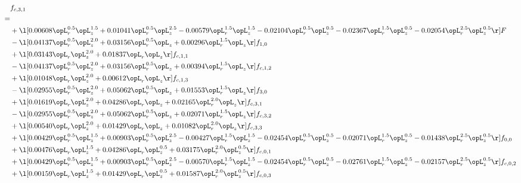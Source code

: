 \begin{alignat}{2} 
\label{eq:f_31_1} 
& f_{c,3,1} \nonumber \\ 
 = \\ 
& + \l[  0.00608 \opL_r^{0.5} \opL_z^{1.5} +  0.01041 \opL_r^{0.5} \opL_z^{2.5}   -0.00579 \opL_r^{1.5} \opL_z^{1.5}   -0.02104 \opL_r^{0.5} \opL_z^{0.5}   -0.02367 \opL_r^{1.5} \opL_z^{0.5}   -0.02054 \opL_r^{2.5} \opL_z^{0.5}  \r] F \nonumber \\ 
& - \l[  0.04137 \opL_r^{0.5} \opL_z^{2.0} +  0.03156 \opL_r^{0.5} \opL_z +  0.00296 \opL_r^{1.5} \opL_z  \r] f_{1,0} \nonumber \\ 
& + \l[  0.03143 \opL_r \opL_z^{2.0} +  0.01837 \opL_r \opL_z  \r] f_{c,1,1} \nonumber \\ 
& - \l[  0.04137 \opL_r^{0.5} \opL_z^{2.0} +  0.03156 \opL_r^{0.5} \opL_z +  0.00394 \opL_r^{1.5} \opL_z  \r] f_{c,1,2} \nonumber \\ 
& + \l[  0.01048 \opL_r \opL_z^{2.0} +  0.00612 \opL_r \opL_z  \r] f_{c,1,3} \nonumber \\ 
& - \l[  0.02955 \opL_r^{0.5} \opL_z^{2.0} +  0.05062 \opL_r^{0.5} \opL_z +  0.01553 \opL_r^{1.5} \opL_z  \r] f_{3,0} \nonumber \\ 
& + \l[  0.01619 \opL_r \opL_z^{2.0} +  0.04286 \opL_r \opL_z +  0.02165 \opL_r^{2.0} \opL_z  \r] f_{c,3,1} \nonumber \\ 
& - \l[  0.02955 \opL_r^{0.5} \opL_z^{2.0} +  0.05062 \opL_r^{0.5} \opL_z +  0.02071 \opL_r^{1.5} \opL_z  \r] f_{c,3,2} \nonumber \\ 
& + \l[  0.00540 \opL_r \opL_z^{2.0} +  0.01429 \opL_r \opL_z +  0.01082 \opL_r^{2.0} \opL_z  \r] f_{c,3,3} \nonumber \\ 
& + \l[  0.00429 \opL_r^{0.5} \opL_z^{1.5} +  0.00903 \opL_r^{0.5} \opL_z^{2.5}   -0.00427 \opL_r^{1.5} \opL_z^{1.5}   -0.02454 \opL_r^{0.5} \opL_z^{0.5}   -0.02071 \opL_r^{1.5} \opL_z^{0.5}   -0.01438 \opL_r^{2.5} \opL_z^{0.5}  \r] f_{0,0} \nonumber \\ 
& + \l[  0.00476 \opL_r \opL_z^{1.5} +  0.04286 \opL_r \opL_z^{0.5} +  0.03175 \opL_r^{2.0} \opL_z^{0.5}  \r] f_{c,0,1} \nonumber \\ 
& + \l[  0.00429 \opL_r^{0.5} \opL_z^{1.5} +  0.00903 \opL_r^{0.5} \opL_z^{2.5}   -0.00570 \opL_r^{1.5} \opL_z^{1.5}   -0.02454 \opL_r^{0.5} \opL_z^{0.5}   -0.02761 \opL_r^{1.5} \opL_z^{0.5}   -0.02157 \opL_r^{2.5} \opL_z^{0.5}  \r] f_{c,0,2} \nonumber \\ 
& + \l[  0.00159 \opL_r \opL_z^{1.5} +  0.01429 \opL_r \opL_z^{0.5} +  0.01587 \opL_r^{2.0} \opL_z^{0.5}  \r] f_{c,0,3} \nonumber \\ 

\end{alignat}
